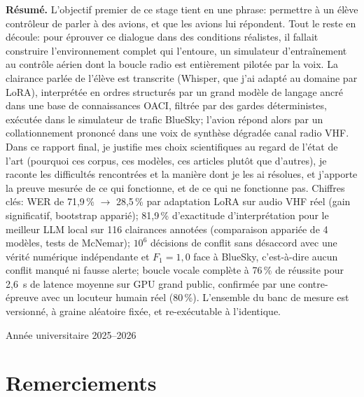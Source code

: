 \documentclass[11pt,a4paper]{article}
\begin{document}
\begin{titlepage}
\vfill
\begin{tcolorbox}[colback=lightgray, colframe=atcblue, arc=3pt, width=0.94\textwidth, center,
 left=12pt, right=12pt, top=8pt, bottom=8pt]
\small
\textbf{Résumé.} L'objectif premier de ce stage tient en une phrase: permettre à un élève contrôleur de parler à des avions, et que les avions lui répondent. Tout le reste en découle: pour éprouver ce dialogue dans des conditions réalistes, il fallait construire l'environnement complet qui l'entoure, un simulateur d'entraînement au contrôle aérien dont la boucle radio est entièrement pilotée par la voix. La clairance parlée de l'élève est transcrite (Whisper, que j'ai adapté au domaine par LoRA), interprétée en ordres structurés par un grand modèle de langage ancré dans une base de connaissances OACI, filtrée par des gardes déterministes, exécutée dans le simulateur de trafic BlueSky; l'avion répond alors par un collationnement prononcé dans une voix de synthèse dégradée canal radio VHF. Dans ce rapport final, je justifie mes choix scientifiques au regard de l'état de l'art (pourquoi ces corpus, ces modèles, ces articles plutôt que d'autres), je raconte les difficultés rencontrées et la manière dont je les ai résolues, et j'apporte la preuve mesurée de ce qui fonctionne, et de ce qui ne fonctionne pas. Chiffres clés:
WER de 71,9\,\% $\rightarrow$ 28,5\,\% par adaptation LoRA sur audio VHF réel (gain
significatif, bootstrap apparié); 81,9\,\% d'exactitude d'interprétation pour le meilleur
LLM local sur 116 clairances annotées (comparaison appariée de 4 modèles, tests de McNemar);
$10^6$ décisions de conflit sans désaccord avec une vérité numérique indépendante et
$F_1 = 1{,}0$ face à BlueSky, c'est-à-dire aucun conflit manqué ni fausse alerte; boucle vocale complète à 76\,\% de réussite pour 2,6~s de latence moyenne sur GPU grand public, confirmée par une contre-épreuve avec un locuteur humain réel (80\,\%). L'ensemble du banc de mesure est versionné, à graine aléatoire fixée, et re-exécutable à l'identique.
\end{tcolorbox}
\vspace{0.4cm}
{\small Année universitaire 2025--2026}
\end{titlepage}

\section*{Remerciements}
\thispagestyle{fancy}
\end{document}
